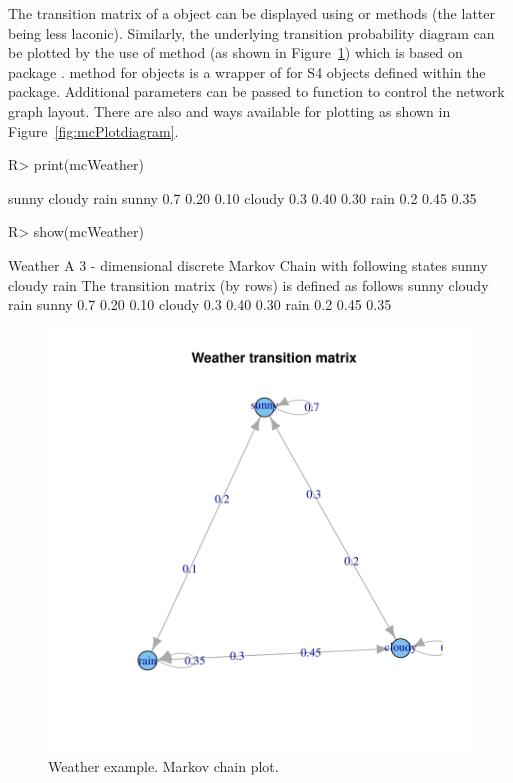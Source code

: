 \documentclass[nojss]{jss}
\begin{document}
The transition matrix of a  object can be displayed using  or  
methods (the latter being less laconic). Similarly, the underlying transition probability diagram 
can be plotted by the use of  method (as shown in Figure~\ref{fig:mcPlot}) which is based on  package \citep{pkg:igraph}.
 method for  objects is a wrapper of
 for  S4 objects defined within the  package. 
Additional parameters can be passed to  function to control the network graph layout.
There are also  and  ways available for plotting as shown in Figure~\ref{fig:mcPlotdiagram}.

\begin{Schunk}
\begin{Sinput}
R> print(mcWeather)
\end{Sinput}
\begin{Soutput}
       sunny cloudy rain
sunny    0.7   0.20 0.10
cloudy   0.3   0.40 0.30
rain     0.2   0.45 0.35
\end{Soutput}
\begin{Sinput}
R> show(mcWeather)
\end{Sinput}
\begin{Soutput}
Weather 
 A  3 - dimensional discrete Markov Chain with following states 
 sunny cloudy rain 
 The transition matrix   (by rows)  is defined as follows 
       sunny cloudy rain
sunny    0.7   0.20 0.10
cloudy   0.3   0.40 0.30
rain     0.2   0.45 0.35
\end{Soutput}
\end{Schunk}

\begin{figure}
\begin{center}
\includegraphics{an_introduction_to_markovchain_package-mcPlot}
\caption{Weather example. Markov chain plot.}
\label{fig:mcPlot}
\end{center}
\end{figure}
\end{document}
